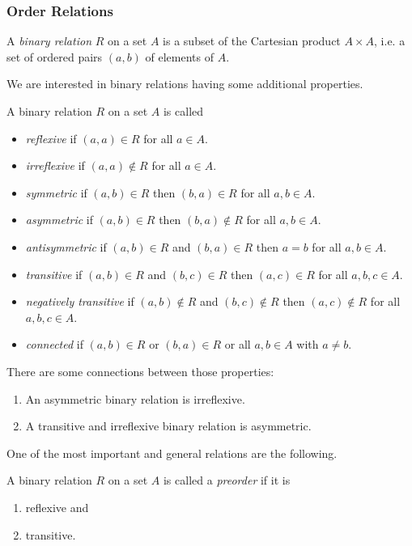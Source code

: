 ﻿\documentclass[a4paper,11pt,twoside,final]{article}
\numberwithin{equation}{subsection}
\begin{document}
\subsubsection{Order Relations}
\begin{defi}
A \emph{binary relation} $R$ on a set $A$ is a subset of the Cartesian product $A\times A$, i.e. a set of ordered pairs $(a,b)$ of elements of $A$.
\end{defi}

We are interested in binary relations having some additional properties.
\begin{defi}
A binary relation $R$ on a set $A$ is called
\begin{itemize}
\item \emph{reflexive} if $(a,a)\in R$ for all $a\in A$.
\item \emph{irreflexive} if $(a,a)\notin R$ for all $a\in A$.
\item \emph{symmetric} if $(a,b)\in R$ then $(b,a)\in R$ for all $a,b\in A$.
\item \emph{asymmetric} if $(a,b)\in R$ then $(b,a)\notin R$ for all $a,b\in A$.
\item \emph{antisymmetric} if $(a,b)\in R$ and $(b,a)\in R$ then $a=b$ for all $a,b\in A$.
\item \emph{transitive} if $(a,b)\in R$ and $(b,c)\in R$ then $(a,c)\in R$ for all $a,b,c\in A$.
\item \emph{negatively transitive} if $(a,b)\notin R$ and $(b,c)\notin R$ then $(a,c)\notin R$ for all $a,b,c\in A$.
\item \emph{connected} if $(a,b)\in R$ or $(b,a)\in R$ or all $a,b\in A$ with $a\neq b$.
\end{itemize}
\end{defi}

There are some connections between those properties:
\begin{lem}
\begin{enumerate}
\item An asymmetric binary relation is irreflexive.
\item A transitive and irreflexive binary relation is asymmetric.
\end{enumerate}
\end{lem}

One of the most important and general relations are the following.
\begin{defi}[Preorder]
A binary relation $R$ on a set $A$ is called a \emph{preorder} if it is
\begin{enumerate}
\item reflexive and
\item transitive.
\end{enumerate}
\end{defi}
\end{document}
